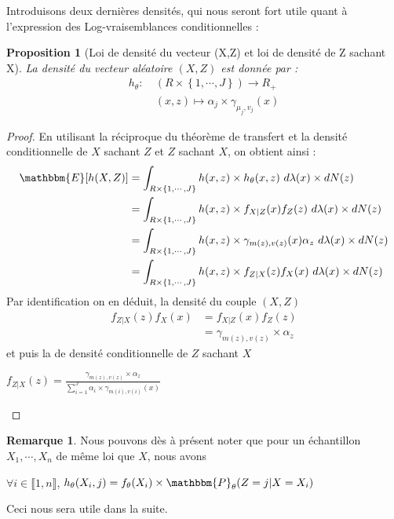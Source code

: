 \documentclass[frenchb]{report}
\newcommand{\1}{\mathbbm{1}}
\newcommand{\E}{\mathbbm{E}}
\newcommand{\prob}{\mathbbm{P}}
\newtheorem{prop}{Proposition}
\theoremstyle{definition}\newtheorem{defn}{Définition}
\theoremstyle{definition}\newtheorem{exm}{Exemple}
\theoremstyle{definition}\newtheorem{nota}{Notation}
\theoremstyle{definition}\newtheorem{rem}{Remarque}
\begin{document}
Introduisons deux dernières densités, qui nous seront fort utile quant à l'expression des Log-vraisemblances conditionnelles :

\begin{prop}[Loi de densité du vecteur (X,Z) et loi de densité de Z sachant X]
La densité du vecteur aléatoire $(X, Z)$ est donnée par :
\begin{align*} 
h_\theta : &~(R\times \left\{1,\cdots,J\right\}) \rightarrow R_+\\
&~(x,z) \mapsto \alpha_j\times\gamma_{\mu_j, v_j}(x) 
\end{align*}
\end{prop}

\begin{proof}
En utilisant la réciproque du théorème de transfert et la densité conditionnelle de $X$ sachant $Z$ et $Z$ sachant $X$, on obtient ainsi :
\begin{align*} 
\E[h(X,Z)] & = \int_{R\times\left\{1,\cdots,J\right\}}h(x,z)\times h_\theta(x,z)~d\lambda(x)\times dN(z)\\
&= \int_{R\times\left\{1,\cdots,J\right\}}h(x,z)\times f_{X|Z}(x) f_Z(z)~d\lambda(x)\times dN(z)\\
&= \int_{R\times\left\{1,\cdots,J\right\}}h(x,z)\times \gamma_{m(z),v(z)}(x)\alpha_z~d\lambda(x)\times dN(z)\\
&= \int_{R\times\left\{1,\cdots,J\right\}}h(x,z)\times f_{Z|X}(z) f_X(x)~d\lambda(x)\times dN(z)\\
\end{align*}
Par identification on en déduit, la densité du couple $(X,Z)$
\begin{align*}
f_{Z|X}(z) f_X(x) &=  f_{X|Z}(x) f_Z(z)\\
&= \gamma_{m(z),v(z)}\times\alpha_z
\end{align*}
et puis la de densité conditionnelle de $Z$ sachant $X$
\begin{center}
$f_{Z|X}(z) =\displaystyle \frac{\gamma_{m(z),v(z)}\times\alpha_z}{\sum_{i=1}^J \alpha_i \times \gamma_{m(i), v(i)}(x)}$
\end{center}
\end{proof}

\begin{rem}
Nous pouvons dès à présent noter que pour un échantillon $X_1, \cdots, X_n$ de même loi que $X$, nous avons 
\begin{center}
$\forall i \in \llbracket 1,n \rrbracket$, $h_\theta(X_i,j) = f_\theta(X_i) \times \prob_\theta(Z = j | X = X_i )$
\end{center}
Ceci nous sera utile dans la suite.
\end{rem}
\end{document}
